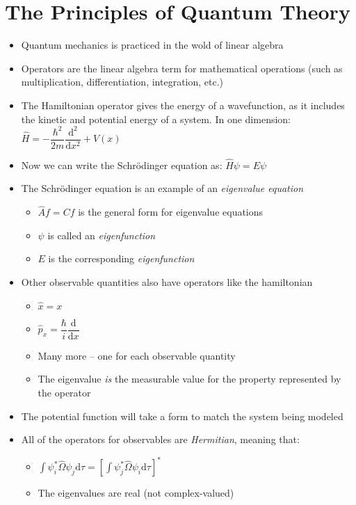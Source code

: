 \documentclass[12pt, openany, letterpaper]{memoir}
\begin{document}
\section{The Principles of Quantum Theory}
\begin{itemize}
	\item Quantum mechanics is practiced in the wold of linear algebra
	\item Operators are the linear algebra term for mathematical operations (such as multiplication, differentiation, integration, etc.)
	\item The Hamiltonian operator gives the energy of a wavefunction, as it includes the kinetic and potential energy of a system. In one dimension: $\hat{H} = -\dfrac{\hbar^2}{2m}\dfrac{\mathrm{d}^2}{\mathrm{d}x^2}+V(x)$
	\item Now we can write the Schr\"odinger equation as: $\hat{H}\psi=E\psi$
	\item The Schr\"odinger equation is an example of an \emph{eigenvalue equation}
	\begin{itemize}
		\item $\hat{A}f=Cf$ is the general form for eigenvalue equations
		\item $\psi$ is called an \emph{eigenfunction}
		\item $E$ is the corresponding \emph{eigenfunction}
	\end{itemize}
	\item Other observable quantities also have operators like the hamiltonian
	\begin{itemize}
		\item $\hat{x} = x$
		\item $\hat{p}_x = \dfrac{\hbar}{i}\dfrac{\mathrm{d}}{\mathrm{d}x}$
		\item Many more -- one for each observable quantity
		\item The eigenvalue \emph{is} the measurable value for the property represented by the operator
	\end{itemize}
	\item The potential function will take a form to match the system being modeled
	\item All of the operators for observables are \emph{Hermitian}, meaning that:
	\begin{itemize}
		\item $\displaystyle\int\psi_i^*\hat{\Omega}\psi_j\mathrm{d}\tau = \left[\displaystyle\int\psi_j^*\hat{\Omega}\psi_i\mathrm{d}\tau\right]^*$
		\item The eigenvalues are real (not complex-valued)

\end{itemize}
\end{itemize}
\end{document}
